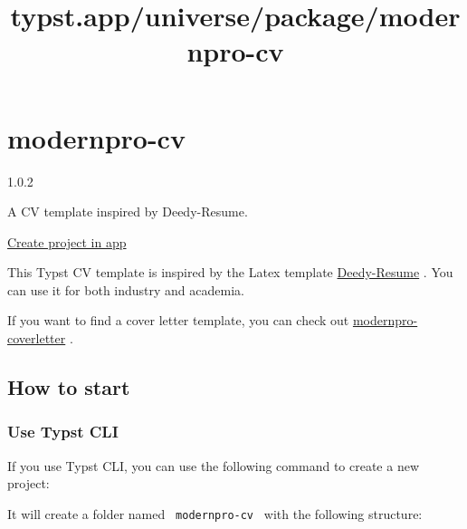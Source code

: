 \title{typst.app/universe/package/modernpro-cv}

\label{banner}
\label{template-thumbnail}

\section{modernpro-cv}\label{modernpro-cv}

{ 1.0.2 }

A CV template inspired by Deedy-Resume.

\href{/app?template=modernpro-cv&version=1.0.2}{Create project in app}

\label{readme}
This Typst CV template is inspired by the Latex template
\href{https://github.com/deedy/Deedy-Resume}{Deedy-Resume} . You can use
it for both industry and academia.

If you want to find a cover letter template, you can check out
\href{https://github.com/jxpeng98/typst-coverletter}{modernpro-coverletter}
.

\subsection{How to start}\label{how-to-start}

\subsubsection{Use Typst CLI}\label{use-typst-cli}

If you use Typst CLI, you can use the following command to create a new
project:

\begin{Shaded}
\begin{Highlighting}[]
\end{Highlighting}
\end{Shaded}

It will create a folder named \texttt{\ modernpro-cv\ } with the
following structure:

\begin{Shaded}
\begin{Highlighting}[]
\end{Highlighting}
\end{Shaded}

